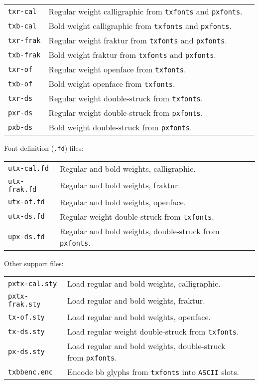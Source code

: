 \documentclass[11pt]{amsart}
\begin{document}
\begin{tabular}{lll}
{\tt txr-cal}&Regular weight calligraphic from {\tt txfonts} and {\tt pxfonts}.\\
{\tt txb-cal}&Bold weight calligraphic from {\tt txfonts} and {\tt pxfonts}.\\
{\tt txr-frak}&Regular weight fraktur from {\tt txfonts} and {\tt pxfonts}.\\
{\tt txb-frak}&Bold weight fraktur from {\tt txfonts} and {\tt pxfonts}.\\
{\tt txr-of}&Regular weight openface from {\tt txfonts}.\\
{\tt txb-of}&Bold weight openface from {\tt txfonts}.\\
{\tt txr-ds}&Regular weight double-struck from {\tt txfonts}.\\
{\tt pxr-ds}&Regular weight double-struck from {\tt pxfonts}.\\
{\tt pxb-ds}&Bold weight double-struck from {\tt pxfonts}.
\end{tabular}

Font definition ({\tt.fd}) files:

\begin{tabular}{lll}
{\tt utx-cal.fd}&Regular and bold weights, calligraphic.\\
{\tt utx-frak.fd}&Regular and bold weights, fraktur.\\
{\tt utx-of.fd}&Regular and bold weights, openface.\\
{\tt utx-ds.fd}&Regular weight double-struck from {\tt txfonts}.\\
{\tt upx-ds.fd}&Regular and bold weights, double-struck from {\tt pxfonts}.
\end{tabular}
\newpage

Other support files:

\begin{tabular}{lll}
{\tt pxtx-cal.sty}&Load regular and bold weights, calligraphic.\\
{\tt pxtx-frak.sty}&Load regular and bold weights, fraktur.\\
{\tt tx-of.sty}&Load regular and bold weights, openface.\\
{\tt tx-ds.sty}&Load regular weight double-struck from {\tt txfonts}.\\
{\tt px-ds.sty}&Load regular and bold weights, double-struck from {\tt pxfonts}.\\
{\tt txbbenc.enc}&Encode bb glyphs from {\tt txfonts} into {\tt\small ASCII} slots.
\end{tabular}
\end{document}

